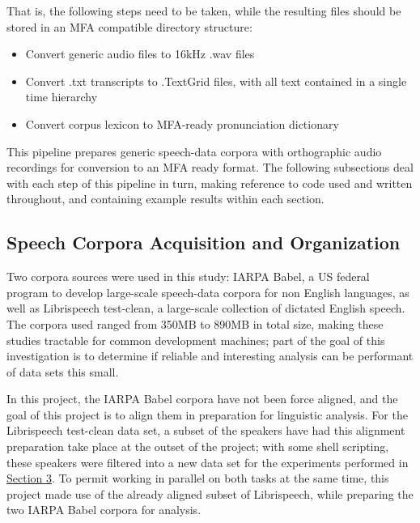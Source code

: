 \documentclass[11pt]{article}
\begin{document}
That is, the following steps need to be taken, while the resulting files should be stored in an MFA compatible directory structure:

\begin{singlespace}
\begin{itemize}
  \item Convert generic audio files to 16kHz .wav files
  \item Convert .txt transcripts to .TextGrid files, with all text contained in a single time hierarchy 
  \item Convert corpus lexicon to MFA-ready pronunciation dictionary
\end{itemize}
\end{singlespace}

This pipeline prepares generic speech-data corpora with orthographic audio recordings for conversion to an MFA ready format. The following subsections deal with each step of this pipeline in turn, making reference to code used and written throughout, and containing example results within each section.

\subsection{Speech Corpora Acquisition and Organization}

Two corpora sources were used in this study: IARPA Babel\cite{benowitz_iarpa_2019}\cite{andrus_iarpa_2016}, a US federal program to develop large-scale speech-data corpora for non English languages, as well as Librispeech test-clean\cite{panayotov_librispeech_2015}, a large-scale collection of dictated English speech. The corpora used ranged from 350MB to 890MB in total size, making these studies tractable for common development machines; part of the goal of this investigation is to determine if reliable and interesting analysis can be performant of data sets this small.

In this project, the IARPA Babel corpora have not been force aligned, and the goal of this project is to align them in preparation for linguistic analysis. For the Librispeech test-clean data set, a subset of the speakers have had this alignment preparation take place at the outset of the project; with some shell scripting, these speakers were filtered into a new data set for the experiments performed in \hyperlink{section.3}{Section 3}. To permit working in parallel on both tasks at the same time, this project made use of the already aligned subset of Librispeech, while preparing the two IARPA Babel corpora for analysis.
\end{document}
